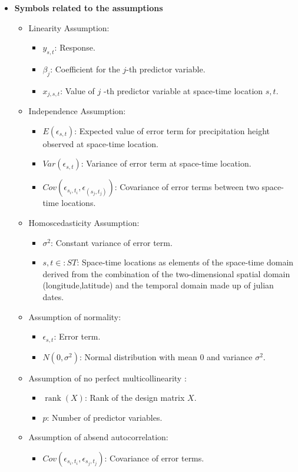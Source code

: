 \documentclass[
  12pt,
]{article}
\begin{document}
\begin{itemize}[label={}]
\item \textbf{Symbols related to the assumptions}
\begin{itemize}[label={}]
\item Linearity Assumption:
\begin{itemize}[label={}]
\item $y_{s,t}$: Response. 
\item $\beta_j$: Coefficient for the $j$-th predictor variable. 
\item $x_{j,s,t}$: Value of $j$ -th predictor variable at space-time location $s,t$. 
\end{itemize}
\item Independence Assumption:
\begin{itemize}[label={}]
\item $E(\epsilon_{s,t})$: Expected value of error term for precipitation height observed at space-time location.
\item $Var(\epsilon_{s,t})$: Variance of error term at space-time location.
\item $Cov(\epsilon_{s_i,t_i}, \epsilon_{(s_j,t_j)})$: Covariance of error terms between two space-time locations.
\end{itemize}
\item Homoscedasticity Assumption:
\begin{itemize}[label={}]
\item $\sigma^2$: Constant variance of error term.
\item $s,t\in:ST$: Space-time locations as elements of the space-time domain derived from the combination of the two-dimensional spatial domain (longitude,latitude) and the temporal domain made up of julian dates.
\end{itemize}
\end{itemize}

\begin{itemize}[label={}]
\item Assumption of normality:
\begin{itemize}[label={}]
\item $\epsilon_{s,t}$: Error term. 
\item $N(0, \sigma^2)$: Normal distribution with mean $0$ and variance $\sigma^2$.
\end{itemize}
\item Assumption of no perfect multicollinearity :
\begin{itemize}[label={}]
\item $\operatorname{rank}(X)$: Rank of the design matrix $X$. 
\item $p$: Number of predictor variables.
\end{itemize}
\item Assumption of absend autocorrelation:
\begin{itemize}[label={}]
\item $Cov(\epsilon_{s_i,t_i}, \epsilon_{s_j,t_j})$: Covariance of error terms.
\end{itemize}
\end{itemize}
\end{itemize}
\end{document}
